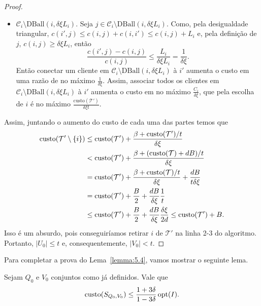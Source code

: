 \begin{proof}
\begin{itemize}
        \item $\mathcal{C}_i \setminus \text{DBall}(i,\delta\xi L_i)$. Seja $j \in \mathcal{C}_i \setminus \text{DBall}(i,\delta\xi L_i)$. Como, pela desigualdade triangular, $c(i',j) \leq c(i,j) + c(i,i') \leq c(i,j) + L_i$ e, pela definição de $j$, $c(i,j) \geq \delta\xi L_i$, então 
        \begin{equation}
            \frac{c(i',j) - c(i,j)}{ c(i,j)} \leq \frac{L_i}{\delta \xi L_i} = \frac{1}{\delta\xi}. \nonumber
        \end{equation}
        Então conectar um cliente em $\mathcal{C}_i \setminus \text{DBall}(i,\delta\xi L_i)$ à $i'$ aumenta o custo em uma razão de no máximo $\frac{1}{\delta\xi}$. Assim, associar todos os clientes em $\mathcal{C}_i \setminus \text{DBall}(i,\delta\xi L_i)$ à $i'$ aumenta o custo em no máximo $\frac{C_i}{\delta\xi}$, que pela escolha de $i$ é no máximo $\frac{\text{custo}(\mathcal{T}')}{\delta\xi t}$.
    \end{itemize}

    Assim, juntando o aumento do custo de cada uma das partes temos que
    \begin{subequations}
        \begin{align*}
            \text{custo}(\mathcal{T}'\setminus\{i\}) &\leq \text{custo}(\mathcal{T}') + \frac{\beta + \text{custo}(\mathcal{T}')/t}{\delta\xi} \\
            &<\text{custo}(\mathcal{T}') + \frac{\beta + (\text{custo}(\mathcal{T}) + dB)/t}{\delta\xi} \\
            &=\text{custo} (\mathcal{T}') + \frac{\beta + \text{custo}(\mathcal{T})/t}{\delta\xi} + \frac{dB}{t\delta\xi} \\
            &=\text{custo} (\mathcal{T}') + \frac{B}{2} + \frac{dB}{\delta\xi} \frac{1}{t} \\
            &\leq \text{custo}(\mathcal{T}') + \frac{B}{2} + \frac{dB}{\delta\xi}\frac{\delta\xi}{2d} \leq \text{custo}(\mathcal{T}') + B.
        \end{align*}
    \end{subequations}
    Isso é um absurdo, pois conseguiríamos retirar $i$ de $\mathcal{T}'$ na linha 2-3 do algoritmo. Portanto, $|U_0| \leq t$ e, consequentemente, $|V_0| < t$.
\end{proof}
Para completar a prova do Lema~\ref{lemma:5.4}, vamos mostrar o seguinte lema.
\begin{lemma}
    Sejam $Q_0$ e $V_0$ conjuntos como já definidos. Vale que 
    \begin{equation}
        \text{custo}(S_{Q_0,V_0}) \leq \frac{1+3\delta}{1-3\delta}\,\mathrm{opt}(I). \nonumber
    \end{equation}
\end{lemma}
